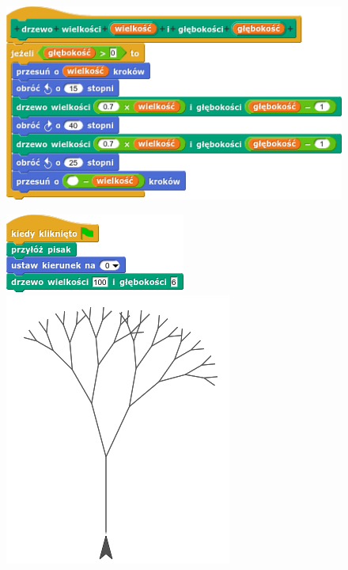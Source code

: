 \documentclass[a4paper]{report}
\begin{document}
\begin{figure}[H]
\centering
\includegraphics[scale=\defaultGraphicsScale]{skrypt-bloku-drzewo}\\
\begin{minipage}{0.5\textwidth}
\centering
\includegraphics[scale=\defaultGraphicsScale]{blok-drzewo-w-skrypcie}
\end{minipage}%
\begin{minipage}{0.5\textwidth}
\centering
\includegraphics[scale=\defaultGraphicsScale]{../common/tree}
\end{minipage}%
\end{figure}
\end{document}
